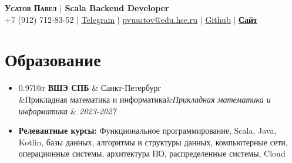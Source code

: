 \documentclass[letterpaper,10pt]{article}
\makeatletter
\newcommand{\resumeSubheading}[4]{
	\vspace{-1pt}\item
	\begin{tabular*}{0.97\textwidth}{l@{\extracolsep{\fill}}r}
		\textbf{#1} & #2 \\
		\ifx&#3&\else\textit{\small#3} & \textit{\small #4} \\ \fi
	\end{tabular*}\vspace{-5pt}
}
\newcommand{\resumeSubHeadingListStart}{\begin{itemize}[leftmargin=0.15in, label={}]}
\newcommand{\resumeSubHeadingListEnd}{\end{itemize}}
\makeatother
\begin{document}

	\begin{center}
		\textbf{\Large \scshape Усатов Павел} \textbf{\Large $|$ Scala Backend Developer} \\ \vspace{1pt}
		\small +7 (912) 712-83-52 $|$
		\href{https://t.me/Usatov_Pavel}{\underline{Telegram}} $|$
		\href{mailto:pvusatov@edu.hse.ru}{\underline{pvusatov@edu.hse.ru}} $|$
		\href{https://github.com/UsatovPavel}{\underline{Github}} $|$
        \href{https://usatovpavel.ru}{\underline{\textbf{Сайт}}}
	\end{center}


	\section{Образование}
	\resumeSubHeadingListStart
	\resumeSubheading
	{ВШЭ СПБ}{Санкт-Петербург}
	{Прикладная математика и информатика}{2023-2027}
	\item \textbf{Релевантные курсы:}
	Функциональное программирование, Scala, Java, Kotlin, базы данных,
	алгоритмы и структуры данных, компьютерные сети, операционные системы, архитектура ПО, распределенные системы, Cloud
	\resumeSubHeadingListEnd


\end{document}
